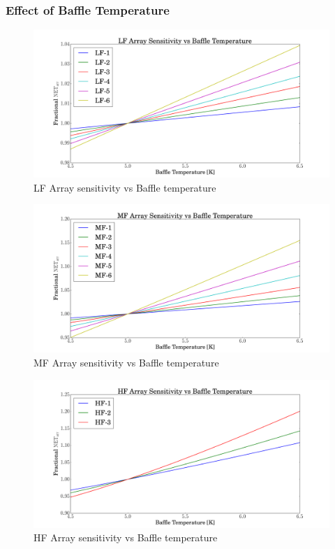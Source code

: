 \documentclass[12pt, titlepage]{article} %
\begin{document}

\subsubsection{Effect of Baffle Temperature}

\begin{figure}[H]
	\centering
	\includegraphics[width=1.1\textwidth, center]{PDF/TempDependence_Baffle_LF.pdf}
	\caption{LF Array sensitivity vs Baffle temperature}
\end{figure}

\begin{figure}[H]
	\centering
	\includegraphics[width=1.1\textwidth, center]{PDF/TempDependence_Baffle_MF.pdf}
	\caption{MF Array sensitivity vs Baffle temperature}
\end{figure}
	
\begin{figure}[H]
	\centering
	\includegraphics[width=1.1\textwidth, center]{PDF/TempDependence_Baffle_HF.pdf}
	\caption{HF Array sensitivity vs Baffle temperature}
\end{figure}
\end{document}
